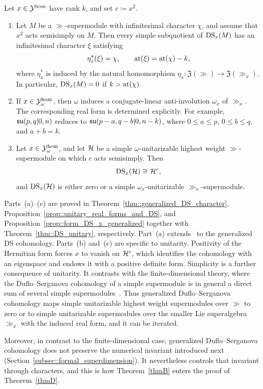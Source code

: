 \begin{bigthm}\label{thmB}
Let $x\in{\mathcal Y}^{\hom}$ have rank $k$, and set $c\coloneqq x^{2}$.
\begin{enumerate}
\item[(a)] Let $M$ be a $\gg$-supermodule with infinitesimal character $\chi$, and assume that $x^2$ acts semisimply on $M$. Then every simple subquotient of $\operatorname{DS}_x(M)$ has an infinitesimal character $\xi$ satisfying
\[
\eta_x^\ast(\xi)=\chi,
\qquad
{\operatorname{at}}(\xi)={\operatorname{at}}(\chi)-k,
\]
where $\eta_x^\ast$ is induced by the natural homomorphism $\eta_x\colon\mathfrak Z(\gg)\to\mathfrak Z(\gg_x)$. In particular, $\operatorname{DS}_x(M)=0$ if $k>{\operatorname{at}}(\chi)$.
\item[(b)] If $x\in{\mathcal Y}^{\hom}_\omega$, then $\omega$ induces a conjugate-linear anti-involution $\omega_x$ of $\gg_x$. The corresponding real form is determined explicitly. For example, ${\mathfrak{su}}(p,q\vert0,n)$ reduces to ${\mathfrak{su}}(p-a,q-b\vert0,n-k)$, where $0\leq a\leq p$, $0\leq b\leq q$, and $a+b=k$.
\item[(c)] Let $x\in{\mathcal Y}^{\hom}_\omega$, and let ${\mathcal{H}}$ be a simple $\omega$-unitarizable highest weight $\gg$-supermodule on which $c$ acts semisimply. Then
\[
\operatorname{DS}_x({\mathcal{H}})\cong{\mathcal{H}}^{c},
\]
and $\operatorname{DS}_x({\mathcal{H}})$ is either zero or a simple $\omega_x$-unitarizable $\gg_x$-supermodule.
\end{enumerate}
\end{bigthm}
Parts~(a)--(c) are proved in Theorem~\ref{thm::generalized_DS_character}, Proposition~\ref{prop::unitary_real_forms_and_DS}, and Proposition~\ref{prop::form_DS_x_generalized} together with Theorem~\ref{thm::DS_unitary}, respectively. Part~(a) extends~\cite[Theorem~2.1]{serganova2011superdimension} to the generalized DS cohomology. Parts~(b) and~(c) are specific to unitarity. Positivity of the Hermitian form forces $x$ to vanish on ${\mathcal{H}}^c$, which identifies the cohomology with an eigenspace and endows it with a positive definite form. Simplicity is a further consequence of unitarity. It contrasts with the finite-dimensional theory, where the Duflo--Serganova cohomology of a simple supermodule is in general a direct sum of several simple supermodules~\cite{heidersdorf2021cohomological}. Thus generalized Duflo--Serganova cohomology maps simple unitarizable highest weight supermodules over $\gg$ to zero or to simple unitarizable supermodules over the smaller Lie superalgebra $\gg_x$ with the induced real form, and it can be iterated.

Moreover, in contrast to the finite-dimensional case, generalized Duflo--Serganova cohomology does not preserve the numerical invariant introduced next (Section~\ref{subsec::formal_superdimension}). It nevertheless controls that invariant through characters, and this is how Theorem~\ref{thmB} enters the proof of Theorem~\ref{thmD}.

